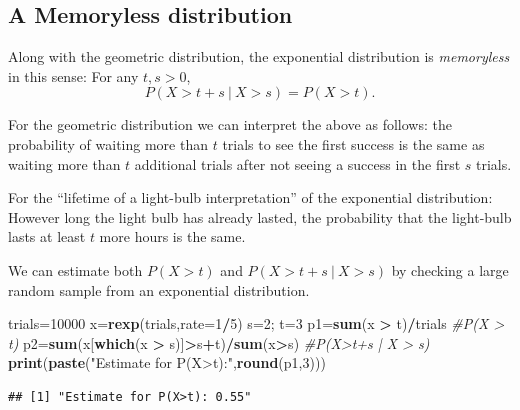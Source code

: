\documentclass[
]{book}
\newenvironment{Shaded}{\begin{snugshade}}{\end{snugshade}}
\newcommand{\AttributeTok}[1]{\textcolor[rgb]{0.13,0.29,0.53}{#1}}
\newcommand{\CommentTok}[1]{\textcolor[rgb]{0.56,0.35,0.01}{\textit{#1}}}
\newcommand{\DecValTok}[1]{\textcolor[rgb]{0.00,0.00,0.81}{#1}}
\newcommand{\FunctionTok}[1]{\textcolor[rgb]{0.13,0.29,0.53}{\textbf{#1}}}
\newcommand{\NormalTok}[1]{#1}
\newcommand{\OtherTok}[1]{\textcolor[rgb]{0.56,0.35,0.01}{#1}}
\newcommand{\SpecialCharTok}[1]{\textcolor[rgb]{0.81,0.36,0.00}{\textbf{#1}}}
\newcommand{\StringTok}[1]{\textcolor[rgb]{0.31,0.60,0.02}{#1}}
\theoremstyle{definition}
\theoremstyle{definition}
\theoremstyle{definition}
\theoremstyle{definition}
\theoremstyle{remark}
\begin{document}
\subsection*{A Memoryless distribution}\label{a-memoryless-distribution}

Along with the geometric distribution, the exponential distribution is \emph{memoryless} in this sense: For any \(t,s>0\), \[P(X > t + s~|~X > s) = P(X > t).\]

For the geometric distribution we can interpret the above as follows: the probability of waiting more than \(t\) trials to see the first success is the same as waiting more than \(t\) additional trials after not seeing a success in the first \(s\) trials.

For the ``lifetime of a light-bulb interpretation'' of the exponential distribution: However long the light bulb has already lasted, the probability that the light-bulb lasts at least \(t\) more hours is the same.

We can estimate both \(P(X>t)\) and \(P(X>t+s ~|~ X>s)\) by checking a large random sample from an exponential distribution.

\begin{Shaded}
\begin{Highlighting}[]
\NormalTok{trials}\OtherTok{=}\DecValTok{10000}
\NormalTok{x}\OtherTok{=}\FunctionTok{rexp}\NormalTok{(trials,}\AttributeTok{rate=}\DecValTok{1}\SpecialCharTok{/}\DecValTok{5}\NormalTok{)}
\NormalTok{s}\OtherTok{=}\DecValTok{2}\NormalTok{; t}\OtherTok{=}\DecValTok{3}
\NormalTok{p1}\OtherTok{=}\FunctionTok{sum}\NormalTok{(x }\SpecialCharTok{\textgreater{}}\NormalTok{ t)}\SpecialCharTok{/}\NormalTok{trials }\CommentTok{\#P(X \textgreater{} t)}
\NormalTok{p2}\OtherTok{=}\FunctionTok{sum}\NormalTok{(x[}\FunctionTok{which}\NormalTok{(x }\SpecialCharTok{\textgreater{}}\NormalTok{ s)]}\SpecialCharTok{\textgreater{}}\NormalTok{s}\SpecialCharTok{+}\NormalTok{t)}\SpecialCharTok{/}\FunctionTok{sum}\NormalTok{(x}\SpecialCharTok{\textgreater{}}\NormalTok{s) }\CommentTok{\#P(X\textgreater{}t+s | X \textgreater{} s)}
\FunctionTok{print}\NormalTok{(}\FunctionTok{paste}\NormalTok{(}\StringTok{"Estimate for P(X\textgreater{}t):"}\NormalTok{,}\FunctionTok{round}\NormalTok{(p1,}\DecValTok{3}\NormalTok{)))}
\end{Highlighting}
\end{Shaded}

\begin{verbatim}
## [1] "Estimate for P(X>t): 0.55"
\end{verbatim}
\end{document}
